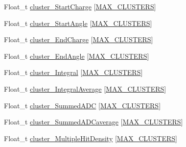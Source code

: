 \begin{DoxyCompactItemize}
\item 
Float\-\_\-t \hyperlink{classanatree_a793a4a4bae0507a4ba0e9792a76c15f9}{cluster\-\_\-\-Start\-Charge} \mbox{[}\hyperlink{anatree__core__v09410002__orig_8h_a7250daa0fff832693cecd6907e64f6ec}{M\-A\-X\-\_\-\-C\-L\-U\-S\-T\-E\-R\-S}\mbox{]}
\item 
Float\-\_\-t \hyperlink{classanatree_a635037cd901f82f5989db10754a3daaa}{cluster\-\_\-\-Start\-Angle} \mbox{[}\hyperlink{anatree__core__v09410002__orig_8h_a7250daa0fff832693cecd6907e64f6ec}{M\-A\-X\-\_\-\-C\-L\-U\-S\-T\-E\-R\-S}\mbox{]}
\item 
Float\-\_\-t \hyperlink{classanatree_a8ff61ed4971f8971c8dcd7864f8365a6}{cluster\-\_\-\-End\-Charge} \mbox{[}\hyperlink{anatree__core__v09410002__orig_8h_a7250daa0fff832693cecd6907e64f6ec}{M\-A\-X\-\_\-\-C\-L\-U\-S\-T\-E\-R\-S}\mbox{]}
\item 
Float\-\_\-t \hyperlink{classanatree_a78a610702659e215d108a77093d55962}{cluster\-\_\-\-End\-Angle} \mbox{[}\hyperlink{anatree__core__v09410002__orig_8h_a7250daa0fff832693cecd6907e64f6ec}{M\-A\-X\-\_\-\-C\-L\-U\-S\-T\-E\-R\-S}\mbox{]}
\item 
Float\-\_\-t \hyperlink{classanatree_ac129a3af06f26d24412a2d586870876b}{cluster\-\_\-\-Integral} \mbox{[}\hyperlink{anatree__core__v09410002__orig_8h_a7250daa0fff832693cecd6907e64f6ec}{M\-A\-X\-\_\-\-C\-L\-U\-S\-T\-E\-R\-S}\mbox{]}
\item 
Float\-\_\-t \hyperlink{classanatree_a378a2760d90681d32eae8e58ee2fbc4d}{cluster\-\_\-\-Integral\-Average} \mbox{[}\hyperlink{anatree__core__v09410002__orig_8h_a7250daa0fff832693cecd6907e64f6ec}{M\-A\-X\-\_\-\-C\-L\-U\-S\-T\-E\-R\-S}\mbox{]}
\item 
Float\-\_\-t \hyperlink{classanatree_a397a20760df6b185d51e4ec05a2c3cc2}{cluster\-\_\-\-Summed\-A\-D\-C} \mbox{[}\hyperlink{anatree__core__v09410002__orig_8h_a7250daa0fff832693cecd6907e64f6ec}{M\-A\-X\-\_\-\-C\-L\-U\-S\-T\-E\-R\-S}\mbox{]}
\item 
Float\-\_\-t \hyperlink{classanatree_ae92ddb9730100551d6f56993330895d9}{cluster\-\_\-\-Summed\-A\-D\-Caverage} \mbox{[}\hyperlink{anatree__core__v09410002__orig_8h_a7250daa0fff832693cecd6907e64f6ec}{M\-A\-X\-\_\-\-C\-L\-U\-S\-T\-E\-R\-S}\mbox{]}
\item 
Float\-\_\-t \hyperlink{classanatree_a0ba0ad2840d19d34be27051d33438d1d}{cluster\-\_\-\-Multiple\-Hit\-Density} \mbox{[}\hyperlink{anatree__core__v09410002__orig_8h_a7250daa0fff832693cecd6907e64f6ec}{M\-A\-X\-\_\-\-C\-L\-U\-S\-T\-E\-R\-S}\mbox{]}
\item 

\end{DoxyCompactItemize}
